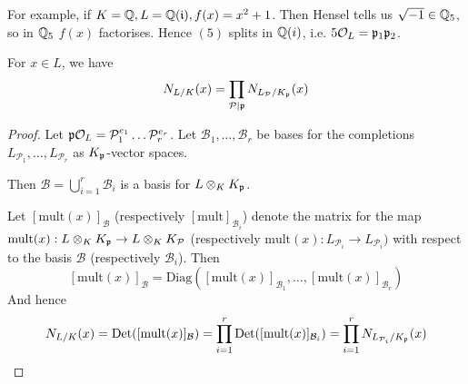 \documentclass[10pt,a4paper]{article}
\begin{document}
For example, if $K = \mathbb{Q}, L= \mathbb{Q}(\mathfrak{i}), f(x) = x^2+1$. Then Hensel tells us $\sqrt{-1} \in \mathbb{Q}_5$, so in $\mathbb{Q}_5$ $f(x)$ factorises. Hence $(5)$ splits in $\mathbb{Q}(i)$, i.e. $5 \mathcal{O}_L = \mathfrak{p}_1\mathfrak{p}_2$.
\begin{corollary}
  For $x \in L$, we have
  \[N_{L/K}(x) = \prod_{\mathcal{P}|\mathfrak{p}} N_{L_{\mathcal{P}}/K_{\mathfrak{p}}}(x)\]
\end{corollary}
\begin{proof}
  Let $\mathfrak{p}\mathcal{O}_L = \mathcal{P}_1^{e_1} \ldots \mathcal{P}_r^{e_r}$. Let $\mathcal{B}_1, \ldots, \mathcal{B}_r$ be bases for the completions $L_{\mathcal{P}_1}, \ldots, L_{\mathcal{P}_r}$ as $K_{\mathfrak{p}}$-vector spaces.

  Then $\mathcal{B} = \bigcup_{i=1}^r \mathcal{B}_i$ is a basis for $L \otimes_K K_{\mathfrak{p}}$.

  Let $[\text{mult}(x)]_\mathcal{B}$ (respectively $[\text{mult}]_{\mathcal{B}_i}$) denote the matrix for the map $\text{mult}(x):L\otimes_K K_{\mathfrak{p}} \to L\otimes_K K_\mathcal{P}$ (respectively $\text{mult}(x):L_{\mathcal{P}_i} \to L_{\mathcal{P}_i})$ with respect to the basis $\mathcal{B}$ (respectively $\mathcal{B}_i$). Then
  \[[\text{mult}(x)]_\mathcal{B} = \text{Diag}([\text{mult}(x)]_{\mathcal{B_1}}, \ldots, [\text{mult}(x)]_{\mathcal{B}_r})\]
  And hence
  \[N_{L/K}(x) = \operatorname{Det}([\text{mult}(x)]_\mathcal{B}) = \prod_{i=1}^r \operatorname{Det}([\text{mult}(x)]_{\mathcal{B}_i}) = \prod_{i=1}^r N_{L_{\mathcal{P}_i}/K_{\mathfrak{p}}}(x)\]
\end{proof}
\end{document}
